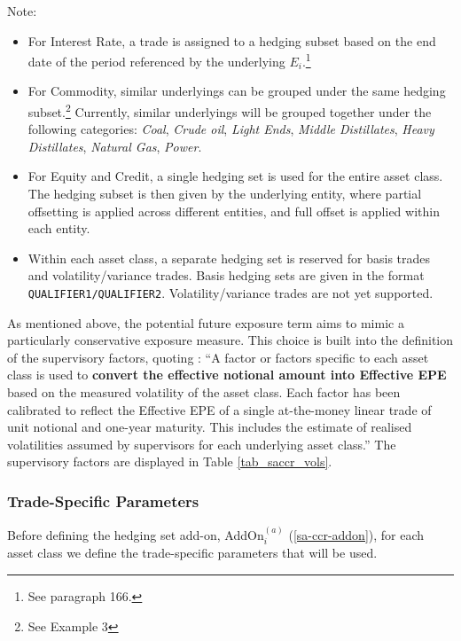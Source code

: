Note: 
\begin{itemize}
  \item For Interest Rate, a trade is assigned to a hedging subset
  based on the end date of the period referenced by the underlying $E_i$.\footnote{See \cite{bcbs279} paragraph 166.}
  \item For Commodity, similar underlyings can be grouped
  under the same hedging subset.\footnote{See \cite{bcbs279} Example 3}
  Currently, similar underlyings will be grouped together under the following categories:
  \emph{Coal}, \emph{Crude oil}, \emph{Light Ends}, \emph{Middle Distillates}, \emph{Heavy Distillates},
  \emph{Natural Gas}, \emph{Power}.
  \item For Equity and Credit, a single hedging set is used for the entire asset class.
  The hedging subset is then given by the underlying entity, where partial offsetting is applied across different entities, and full offset is applied within each entity.
  \item Within each asset class, a separate hedging set is reserved for basis trades and volatility/variance trades.
  Basis hedging sets are given in the format \lstinline!QUALIFIER1/QUALIFIER2!.
  Volatility/variance trades are not yet supported.
\end{itemize}

As mentioned above, the potential future exposure term aims to mimic a
particularly conservative exposure measure. This choice is built into
the definition of the supervisory factors, quoting \cite{bcbs279}: 
``A factor or factors specific to each asset class is used to 
{\bf convert the effective notional amount into Effective EPE} 
based on the measured volatility of the asset class. Each factor has 
been calibrated to reflect the Effective EPE of a single at-the-money 
linear trade of unit notional and one-year maturity. This includes the 
estimate of realised volatilities assumed by supervisors for each 
underlying asset class.''
The supervisory factors are displayed in Table \ref{tab_saccr_vols}.

\subsubsection{Trade-Specific Parameters}

Before defining the hedging set add-on, AddOn$^{(a)}_i$ (\ref{sa-ccr-addon}),
for each asset class we define the trade-specific parameters that will be used.

